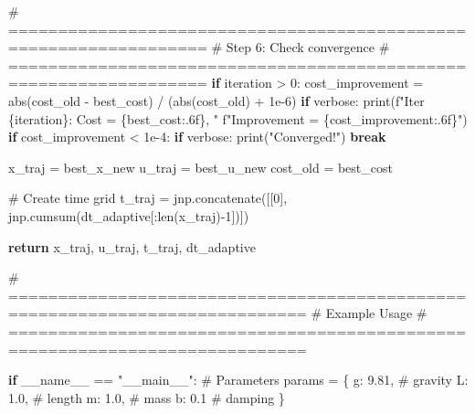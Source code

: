 \documentclass[
  letterpaper,
  DIV=11,
  numbers=noendperiod]{scrartcl}
\newenvironment{Shaded}{\begin{snugshade}}{\end{snugshade}}
\newcommand{\BuiltInTok}[1]{\textcolor[rgb]{0.00,0.23,0.31}{#1}}
\newcommand{\CommentTok}[1]{\textcolor[rgb]{0.37,0.37,0.37}{#1}}
\newcommand{\ControlFlowTok}[1]{\textcolor[rgb]{0.00,0.23,0.31}{\textbf{#1}}}
\newcommand{\DecValTok}[1]{\textcolor[rgb]{0.68,0.00,0.00}{#1}}
\newcommand{\FloatTok}[1]{\textcolor[rgb]{0.68,0.00,0.00}{#1}}
\newcommand{\NormalTok}[1]{\textcolor[rgb]{0.00,0.23,0.31}{#1}}
\newcommand{\OperatorTok}[1]{\textcolor[rgb]{0.37,0.37,0.37}{#1}}
\newcommand{\SpecialCharTok}[1]{\textcolor[rgb]{0.37,0.37,0.37}{#1}}
\newcommand{\SpecialStringTok}[1]{\textcolor[rgb]{0.13,0.47,0.30}{#1}}
\newcommand{\StringTok}[1]{\textcolor[rgb]{0.13,0.47,0.30}{#1}}
\newcommand{\VariableTok}[1]{\textcolor[rgb]{0.07,0.07,0.07}{#1}}
\begin{document}
\begin{Shaded}
\begin{Highlighting}[]
        \CommentTok{\# ==================================================================}
        \CommentTok{\# Step 6: Check convergence}
        \CommentTok{\# ==================================================================}
        \ControlFlowTok{if}\NormalTok{ iteration }\OperatorTok{\textgreater{}} \DecValTok{0}\NormalTok{:}
\NormalTok{            cost\_improvement }\OperatorTok{=} \BuiltInTok{abs}\NormalTok{(cost\_old }\OperatorTok{{-}}\NormalTok{ best\_cost) }\OperatorTok{/}\NormalTok{ (}\BuiltInTok{abs}\NormalTok{(cost\_old) }\OperatorTok{+} \FloatTok{1e{-}6}\NormalTok{)}
            \ControlFlowTok{if}\NormalTok{ verbose:}
                \BuiltInTok{print}\NormalTok{(}\SpecialStringTok{f"Iter }\SpecialCharTok{\{}\NormalTok{iteration}\SpecialCharTok{\}}\SpecialStringTok{: Cost = }\SpecialCharTok{\{}\NormalTok{best\_cost}\SpecialCharTok{:.6f\}}\SpecialStringTok{, "}
                      \SpecialStringTok{f"Improvement = }\SpecialCharTok{\{}\NormalTok{cost\_improvement}\SpecialCharTok{:.6f\}}\SpecialStringTok{"}\NormalTok{)}
            \ControlFlowTok{if}\NormalTok{ cost\_improvement }\OperatorTok{\textless{}} \FloatTok{1e{-}4}\NormalTok{:}
                \ControlFlowTok{if}\NormalTok{ verbose:}
                    \BuiltInTok{print}\NormalTok{(}\StringTok{"Converged!"}\NormalTok{)}
                \ControlFlowTok{break}

\NormalTok{        x\_traj }\OperatorTok{=}\NormalTok{ best\_x\_new}
\NormalTok{        u\_traj }\OperatorTok{=}\NormalTok{ best\_u\_new}
\NormalTok{        cost\_old }\OperatorTok{=}\NormalTok{ best\_cost}

    \CommentTok{\# Create time grid}
\NormalTok{    t\_traj }\OperatorTok{=}\NormalTok{ jnp.concatenate([[}\DecValTok{0}\NormalTok{], jnp.cumsum(dt\_adaptive[:}\BuiltInTok{len}\NormalTok{(x\_traj)}\OperatorTok{{-}}\DecValTok{1}\NormalTok{])])}

    \ControlFlowTok{return}\NormalTok{ x\_traj, u\_traj, t\_traj, dt\_adaptive}

\CommentTok{\# ============================================================================}
\CommentTok{\# Example Usage}
\CommentTok{\# ============================================================================}

\ControlFlowTok{if} \VariableTok{\_\_name\_\_} \OperatorTok{==} \StringTok{"\_\_main\_\_"}\NormalTok{:}
    \CommentTok{\# Parameters}
\NormalTok{    params }\OperatorTok{=}\NormalTok{ \{}
        \StringTok{\textquotesingle{}g\textquotesingle{}}\NormalTok{: }\FloatTok{9.81}\NormalTok{,  }\CommentTok{\# gravity}
        \StringTok{\textquotesingle{}L\textquotesingle{}}\NormalTok{: }\FloatTok{1.0}\NormalTok{,   }\CommentTok{\# length}
        \StringTok{\textquotesingle{}m\textquotesingle{}}\NormalTok{: }\FloatTok{1.0}\NormalTok{,   }\CommentTok{\# mass}
        \StringTok{\textquotesingle{}b\textquotesingle{}}\NormalTok{: }\FloatTok{0.1}    \CommentTok{\# damping}
\NormalTok{    \}}


\end{Highlighting}
\end{Shaded}
\end{document}
